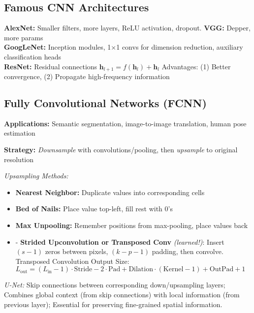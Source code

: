\subsection{Famous CNN Architectures}

\textbf{AlexNet:} Smaller filters, more layers, ReLU activation, dropout. \textbf{VGG:} Depper, more params \\
\textbf{GoogLeNet:} Inception modules, 1×1 convs for dimension reduction, auxiliary classification heads\\
\textbf{ResNet:} Residual connections $\mathbf{h}_{l+1} = f(\mathbf{h}_l) + \mathbf{h}_l$
Advantages: (1) Better convergence, (2) Propagate high-frequency information

\subsection{Fully Convolutional Networks (FCNN)}

\textbf{Applications:} Semantic segmentation, image-to-image translation, human pose estimation

\textbf{Strategy:} \textit{Downsample} with convolutions/pooling, then \textit{upsample} to original resolution

\emph{Upsampling Methods:}
\begin{itemize}
    \item \textbf{Nearest Neighbor:} Duplicate values into corresponding cells
    \item \textbf{Bed of Nails:} Place value top-left, fill rest with $0$'s
    \item \textbf{Max Unpooling:} Remember positions from max-pooling, place values back
    \item - \textbf{Strided Upconvolution or Transposed Conv} \textit{(learned!)}:  Insert $(s-1)$ zeros between pixels, $(k-p-1)$ padding, then convolve. Transposed Convolution Output Size: $L_{\text{out}} = (L_{\text{in}} - 1) \cdot \text{Stride} - 2 \cdot \text{Pad} + \text{Dilation} \cdot (\text{Kernel} - 1) + \text{OutPad} + 1$
\end{itemize}

\emph{U-Net:} Skip connections between corresponding down/upsampling layers; Combines global context (from skip connections) with local information (from previous layer); Essential for preserving fine-grained spatial information.